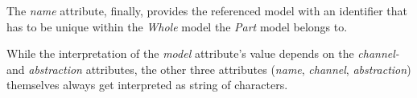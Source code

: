 The \emph{name} attribute, finally, provides the referenced model with an
identifier that has to be unique within the \emph{Whole} model the \emph{Part}
model belongs to.

While the interpretation of the \emph{model} attribute's value depends on the
\emph{channel-} and \emph{abstraction} attributes, the other three attributes
(\emph{name}, \emph{channel}, \emph{abstraction}) themselves always get
interpreted as string of characters.
